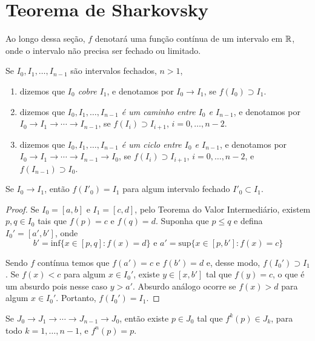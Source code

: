 \section{Teorema de Sharkovsky}
Ao longo dessa seção, $f$ denotará uma função contínua de um intervalo em $\mathbb{R}$, onde o intervalo não precisa ser fechado ou limitado.
\begin{definition}
Se $I_0, I_1, \dots, I_{n-1}$ são intervalos fechados, $n > 1$,
\begin{enumerate}
\item dizemos que \textit{$I_0$ cobre $I_1$}, e denotamos por $I_0 \longrightarrow I_1$, se $f(I_0) \supset I_1$.

\item dizemos  que \textit{$I_0, I_1, \dots, I_{n-1}$ é um caminho entre $I_0$ e $I_{n-1}$}, e denotamos por $I_0 \longrightarrow I_1 \longrightarrow \cdots \longrightarrow I_{n-1}$, se $f(I_i) \supset I_{i+1}$, $i = 0, \dots, n-2$.

\item dizemos  que \textit{$I_0, I_1, \dots, I_{n-1}$ é um ciclo entre $I_0$ e $I_{n-1}$}, e denotamos por $I_0 \longrightarrow I_1 \longrightarrow \cdots \longrightarrow I_{n-1} \longrightarrow I_0$, se $f(I_i) \supset I_{i+1}$, $i = 0, \dots, n-2$, e $f(I_{n-1}) \supset I_0$.

\end{enumerate}
\end{definition}

\begin{lemma}
Se $I_0 \longrightarrow I_1$, então $f(I'_0) = I_1$ para algum intervalo fechado $I'_0 \subset I_1$.
\end{lemma}
\begin{proof}
Se $I_0 = [a, b]$ e $I_1 = [c, d]$, pelo Teorema do Valor Intermediário, existem $p, q \in I_0$ tais que $f(p) = c$ e $f(q) = d$. Suponha que $p \leq q$ e defina $I_0' = [a', b']$, onde
$$b' = \textrm{inf}\{x \in [p, q] : f(x) = d\} \textrm{ e } a' = \textrm{sup}\{x \in [p, b'] : f(x) = c\}$$

Sendo $f$ contínua temos que $f(a') = c$ e $f(b') = d$ e, desse modo, $f(I_0') \supset I_1$. Se $f(x) < c$ para algum $x \in I_0'$, existe $y \in [x, b']$ tal que $f(y) = c$, o que é um absurdo pois nesse caso $y > a'$. Absurdo análogo ocorre se $f(x) > d$ para algum $x \in I_0'$. Portanto, $f(I_0') = I_1$.
\end{proof}

\begin{lemma}
Se $J_0 \longrightarrow J_1 \longrightarrow \cdots \longrightarrow J_{n-1} \longrightarrow J_0$, então existe $p \in J_0$ tal que $f^k(p) \in J_k$, para todo $k = 1, \dots, n-1$, e $f^n(p) = p$.
\end{lemma}

